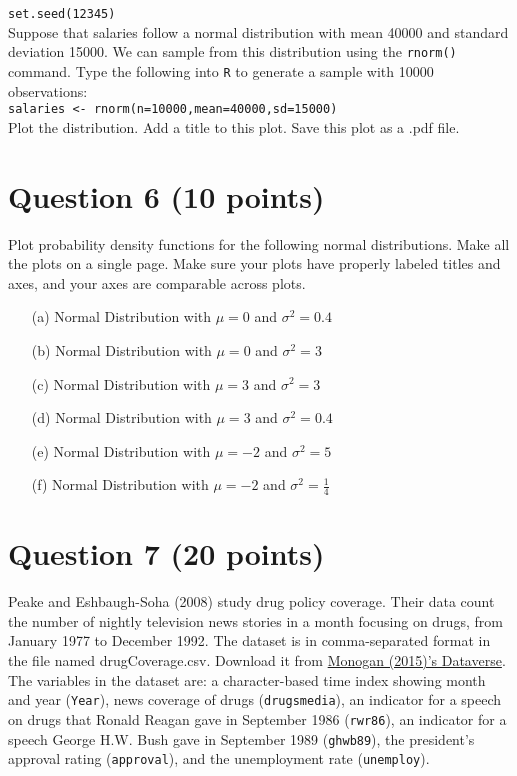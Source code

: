 \documentclass[12pt,letterpaper]{article}
\begin{document}
\noindent \texttt{set.seed(12345)}\\

\noindent Suppose that salaries follow a normal distribution with mean 40000 and standard deviation 15000.  We can sample from this distribution using the \texttt{rnorm()} command.  Type the following into \texttt{R} to generate a sample with 10000 observations: \\

\noindent \texttt{salaries <- rnorm(n=10000,mean=40000,sd=15000)}\\

\noindent Plot the distribution.  Add a title to this plot.  Save this plot as a .pdf file.  \\

\section*{Question 6 (10 points)}
Plot probability density functions for the following normal distributions. Make all the plots on a single page. Make sure your plots have properly labeled titles and axes, and your axes are comparable across plots. \\

\begin{itemize}
\item[(a)]  Normal Distribution with $\mu=0$ and $\sigma^2=0.4$

\item[(b)]  Normal Distribution with $\mu=0$ and $\sigma^2=3$

\item[(c)]  Normal Distribution with $\mu=3$ and $\sigma^2=3$

\item[(d)]  Normal Distribution with $\mu=3$ and $\sigma^2=0.4$

\item[(e)]  Normal Distribution with $\mu=-2$ and $\sigma^2=5$

\item[(f)] Normal Distribution with $\mu=-2$ and $\sigma^2=\frac{1}{4}$


\end{itemize}

\section*{Question 7 (20 points)}
Peake and Eshbaugh-Soha (2008) study drug policy coverage. Their data count the number of nightly television news stories in a month focusing on drugs, from January 1977 to December 1992. The dataset is in comma-separated format in the file named drugCoverage.csv. Download it from \href{https://dataverse.harvard.edu/dataset.xhtml?persistentId=doi:10.7910/DVN/ARKOTI}{Monogan (2015)'s Dataverse}. The variables in the dataset are: a character-based time index showing month and year (\texttt{Year}), news coverage of drugs (\texttt{drugsmedia}), an indicator for a speech on drugs that Ronald Reagan gave in September 1986 (\texttt{rwr86}), an indicator for a speech George H.W. Bush gave in September 1989 (\texttt{ghwb89}), the president's approval rating (\texttt{approval}), and the unemployment rate (\texttt{unemploy}).
\end{document}
